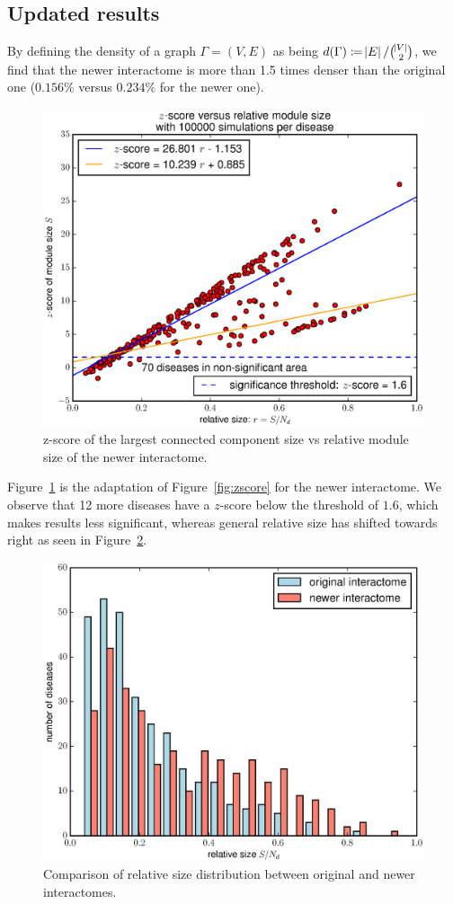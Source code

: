 \documentclass[letterpaper]{article}
\begin{document}
	\subsection{Updated results}
	By defining the density of a graph $\Gamma = (V, E)$ as being $d(\Gamma) \coloneqq \abs E/\binom {\abs V}2$,
	we find that the newer interactome is more than 1.5 times denser than the original one ($0.156\%$ versus $0.234\%$
	for the newer one).

	\begin{figure}%
		\includegraphics[width=.5\textwidth]{images/new_interactome_S4.b100000.eps}
		\caption{z-score of the largest connected component size vs relative module size of the newer interactome.
		\label{fig:new interactome zscore}}
	\end{figure}

	Figure~\ref{fig:new interactome zscore} is the adaptation of Figure~\ref{fig:zscore} for the newer interactome.
	We observe that 12 more diseases have a $z$-score below the threshold of $1.6$, which makes results less significant,
	whereas general relative size has shifted towards right as seen in Figure~\ref{fig:rel sizes comparison}.

	\begin{figure}%
		\includegraphics[width=.5\textwidth]{images/rel_sizes_comparison.eps}
		\caption{Comparison of relative size distribution between original and newer interactomes.\label{fig:rel sizes comparison}}
	\end{figure}
\end{document}
